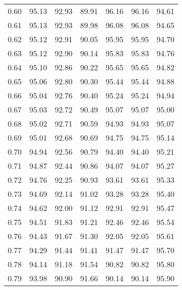 \begin{tabular}{|c|c|c|c|c|c|c|}
      0.60 &     95.13 &     92.93 &      89.91 &   96.16 &      96.16 &         94.61 \\
      0.61 &     95.13 &     92.93 &      89.98 &   96.08 &      96.08 &         94.65 \\
      0.62 &     95.12 &     92.91 &      90.05 &   95.95 &      95.95 &         94.70 \\
      0.63 &     95.12 &     92.90 &      90.14 &   95.83 &      95.83 &         94.76 \\
      0.64 &     95.10 &     92.86 &      90.22 &   95.65 &      95.65 &         94.82 \\
      0.65 &     95.06 &     92.80 &      90.30 &   95.44 &      95.44 &         94.88 \\
      0.66 &     95.04 &     92.76 &      90.40 &   95.24 &      95.24 &         94.94 \\
      0.67 &     95.03 &     92.72 &      90.49 &   95.07 &      95.07 &         95.00 \\
      0.68 &     95.02 &     92.71 &      90.59 &   94.93 &      94.93 &         95.07 \\
      0.69 &     95.01 &     92.68 &      90.69 &   94.75 &      94.75 &         95.14 \\
      0.70 &     94.94 &     92.56 &      90.79 &   94.40 &      94.40 &         95.21 \\
      0.71 &     94.87 &     92.44 &      90.86 &   94.07 &      94.07 &         95.27 \\
      0.72 &     94.76 &     92.25 &      90.93 &   93.61 &      93.61 &         95.33 \\
      0.73 &     94.69 &     92.14 &      91.02 &   93.28 &      93.28 &         95.40 \\
      0.74 &     94.62 &     92.00 &      91.12 &   92.91 &      92.91 &         95.47 \\
      0.75 &     94.51 &     91.83 &      91.21 &   92.46 &      92.46 &         95.54 \\
      0.76 &     94.43 &     91.67 &      91.30 &   92.05 &      92.05 &         95.61 \\
      0.77 &     94.29 &     91.44 &      91.41 &   91.47 &      91.47 &         95.70 \\
      0.78 &     94.14 &     91.18 &      91.54 &   90.82 &      90.82 &         95.80 \\
      0.79 &     93.98 &     90.90 &      91.66 &   90.14 &      90.14 &         95.90 \\

\end{tabular}
